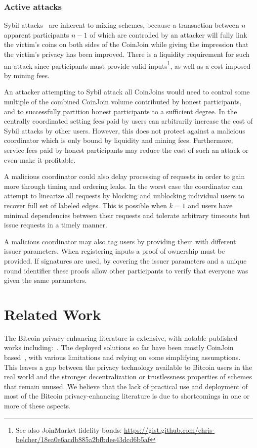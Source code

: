 \documentclass[a4paper]{article}
\begin{document}
\subsubsection{Active attacks}

Sybil attacks~\cite{douceur2002sybil} are inherent to mixing schemes, because a transaction between $n$ apparent participants $n-1$ of which are controlled by an attacker will fully link the victim's coins on both sides of the CoinJoin while giving the impression that the victim's privacy has been improved. There is a liquidity requirement for such an attack since participants must provide valid inputs\footnote{See also JoinMarket fidelity bonds: \url{https://gist.github.com/chris-belcher/18ea0e6acdb885a2bfbdee43dcd6b5af}}, as well as a cost imposed by mining fees.

An attacker attempting to Sybil attack all CoinJoins would need to control some multiple of the combined CoinJoin volume contributed by honest participants, and to successfully partition honest participants to a sufficient degree. In the centrally coordinated setting fees paid by users can arbitrarily increase the cost of Sybil attacks by other users. However, this does not protect against a malicious coordinator which is only bound by liquidity and mining fees. Furthermore, service fees paid by honest participants may reduce the cost of such an attack or even make it profitable.

A malicious coordinator could also delay processing of requests in order to gain more through timing and ordering leaks. In the worst case the coordinator can attempt to linearize all requests by blocking and unblocking individual users to recover full set of labeled edges. This is possible when $k=1$ and users have minimal dependencies between their requests and tolerate arbitrary timeouts but issue requests in a timely manner.

A malicious coordinator may also tag users by providing them with different issuer parameters. When registering inputs a proof of ownership must be provided. If signatures are used, by covering the issuer parameters and a unique round identifier these proofs allow other participants to verify that everyone was given the same parameters.

\section{Related Work}\label{sec:relatedwork}

The Bitcoin privacy-enhancing literature is extensive, with notable published works including:~\cite{bonneau2014mixcoin,bissias2014sybil,ruffing2014coinshuffle,valenta2015blindcoin,ziegeldorf2015coinparty,ruffing2017p2p,maurer2017anonymous,heilman2017tumblebit}. The deployed solutions so far have been mostly CoinJoin based~\cite{maxwell2013coinjoin}, with various limitations and relying on some simplifying assumptions. This leaves a gap between the privacy technology available to Bitcoin users in the real world and the stronger decentralization or trustlessness properties of schemes that remain unused. We believe that the lack of practical use and deployment of most of the Bitcoin privacy-enhancing literature is due to shortcomings in one or more of these aspects.
 
\end{document}
